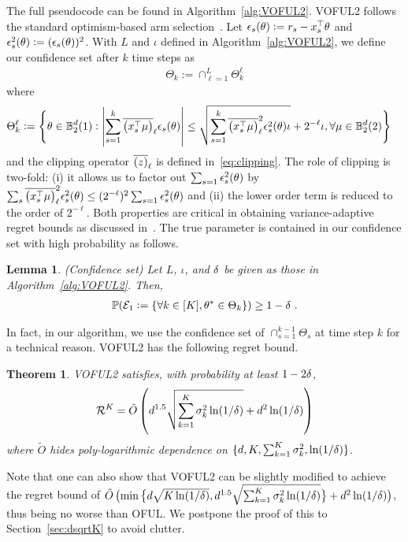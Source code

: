 \documentclass{article}
\newtheorem{theorem}{Theorem}
\newtheorem{lemma}{Lemma}
\def\BB{\mathbb{B}}
\def\clip#1{\wbar{\del{#1}}}
\newcommand{\blue}[1]{{\color[rgb]{.3,.5,1}#1}}
\renewcommand{\blue}[1]{#1}
\begin{document}
The full pseudocode can be found in Algorithm~\ref{alg:VOFUL2}.
VOFUL2 follows the standard optimism-based arm selection~\cite{auer02using,dani08stochastic,ay11improved}.
Let $\blue{\eps_s(\th)} := r_s - x_s^\top\th$ and $\blue{\eps^2_s(\th)} := (\eps_s(\th))^2$.
With $L$ and $\iota$ defined in Algorithm~\ref{alg:VOFUL2}, we define our confidence set after $k$ time steps as 
\begin{align}\label{eq:voful2conf-0}
    \blue{\Theta_{k}} := \cap_{\ell=1}^L \Theta^\ell_k
\end{align}
where
\begin{align}
  &\blue{\Theta^\ell_k} := \Bigg\{ \th \in \BB_2^d(1): \lt|\sum_{s=1}^{k} \clip{x_s^\T \mu }_\ell \eps_s(\th)\rt| \notag
  \leq  \sqrt{\sum_{s=1}^{k} \clip{x_s^\T\mu }_\ell^2 \eps^2_s(\th) \iota } +  2^{-\ell}\iota , \forall \mu\in {\BB_2^d(2)}  \Bigg\}
\end{align}
and the clipping operator $\clip{z}_\ell$ is defined in~\eqref{eq:clipping}.
The role of clipping is two-fold: (i) it allows us to factor out $\sum_{s=1} \epsilon_s^2({\theta})$ by $\sum_s \clip{x_s^\T\mu }_\ell^2 \eps^2_s(\th) \le (2^{-\ell})^2 \sum_{s=1} \eps^2_s(\th)$ and (ii) the lower order term is reduced to the order of $2^{-\ell}$.
Both properties are critical in obtaining variance-adaptive regret bounds as discussed in~\cite{zhang21variance}.
The true parameter is contained in our confidence set with high probability as follows.
\begin{lemma}\label{lem:confset}
  (Confidence set)
  Let $L$, $\iota$, and ${\delta}$ be given as those in Algorithm~\ref{alg:VOFUL2}.
  Then, 
  \begin{align*}
    \mathbb{P}(\blue{\mathcal{E}_1}:=\{\forall k\in[K], \th^* \in  \Theta_k \}) \geq 1-\dt~.
  \end{align*}
\end{lemma}
In fact, in our algorithm, we use the confidence set of $\cap_{s=1}^{k-1} \Theta_s$ at time step $k$ for a technical reason.
VOFUL2 has the following regret bound.
\begin{theorem}\label{main-thm-bandit}
  VOFUL2 satisfies, with probability at least $1-2{\delta}$, 
  \begin{align*}
    \mathcal{R}^K =\tilde O\del{d^{1.5} \sqrt{\sum_{k=1}^K \sig_k^2\ln(1/\dt)} + d^2 \ln(1/\dt)}
  \end{align*}
  where $\tilde O$ hides poly-logarithmic dependence on $\{d,K,\sum_{k=1}^K \sigma_k^{2},  \ln(1/{\delta})\}$. 
\end{theorem}
Note that one can also show that VOFUL2 can be slightly modified to achieve the regret bound of $\tilde O\del[1]{  \min\cbr[1]{d\sqrt{K\ln(1/\dt)}, d^{1.5} \sqrt{\sum_{k=1}^K \sig_k^2\ln(1/\dt)}} + d^2 \ln(1/\dt)} $, thus being no worse than OFUL.
We postpone the proof of this to Section~\ref{sec:dsqrtK} to avoid clutter.
\end{document}
